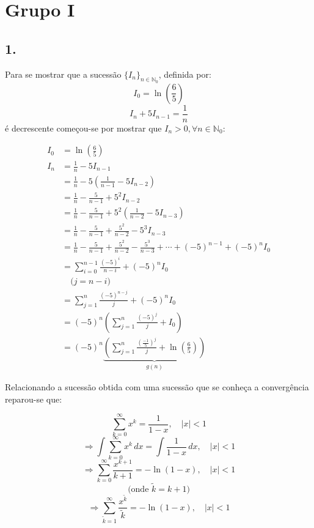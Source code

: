 \documentclass[12pt,a4paper]{article}
\begin{document}
    \setcounter{page}{2}
    \setcounter{secnumdepth}{0} %
    \setlength{\parskip}{0em}

    \newlength{\imagewidth} %
    \setlength{\imagewidth}{8cm} %

  \section{Grupo I}
    \subsection{1.}
        Para se mostrar que a sucessão \(\{I_n\}_{n \in \mathbb{N}_0}\), definida por:
        \[
        I_0 = \ln\left(\frac{6}{5}\right)
        \]
        \[
        I_n + 5I_{n-1} = \frac{1}{n}
        \]
        é decrescente começou-se por mostrar que \( I_n > 0, \forall n \in \mathbb{N}_0 \):

\[
\begin{aligned}
I_0 &= \ln\left(\frac{6}{5}\right) \\
I_n &= \frac{1}{n} - 5I_{n-1} \\
    &= \frac{1}{n} - 5\left(\frac{1}{n-1} - 5I_{n-2} \right) \\
    &= \frac{1}{n} - \frac{5}{n-1} + 5^2I_{n-2} \\
    &= \frac{1}{n} - \frac{5}{n-1} + 5^2\left(\frac{1}{n-2} - 5I_{n-3}\right) \\
    &= \frac{1}{n} - \frac{5}{n-1} + \frac{5^2}{n-2} - 5^3I_{n-3} \\
    &= \frac{1}{n} - \frac{5}{n-1} + \frac{5^2}{n-2} - \frac{5^3}{n-3} + \cdots + (-5)^{n-1} + (-5)^n I_0 \\
    &= \sum_{i=0}^{n-1} \frac{(-5)^i}{n-i} + (-5)^n I_0 \\
    &\quad \text{(} j = n - i\text{)} \\
    &= \sum_{j=1}^{n} \frac{(-5)^{n-j}}{j} + (-5)^n I_0 \\
    &= (-5)^n \left( \sum_{j=1}^{n} \frac{(-5)^j}{j} + I_0 \right) \\
    &= (-5)^n \underbrace{\left( \sum_{j=1}^{n} \frac{\left(\frac{-1}{5}\right)^j}{j} + \ln\left(\frac{6}{5}\right) \right)}_{\textstyle g(n)}
\end{aligned}
\]

Relacionando a sucessão obtida com uma sucessão que se conheça a convergência reparou-se que:

\[
\sum_{k=0}^{\infty} x^k = \frac{1}{1-x}, \quad |x| < 1
\]
\[
\Rightarrow \int \sum_{k=0}^{\infty} x^k \, dx = \int \frac{1}{1-x} \, dx, \quad |x| < 1
\]
\[
\Rightarrow \sum_{k=0}^{\infty} \frac{x^{k+1}}{k+1} = -\ln(1-x), \quad |x| < 1
\]
\[
\text{(onde } \tilde{k} = k+1\text{)}
\]
\[
\Rightarrow \sum_{\tilde{k}=1}^{\infty} \frac{x^{\tilde{k}}}{\tilde{k}} = -\ln(1-x), \quad |x| < 1
\]
\end{document}

